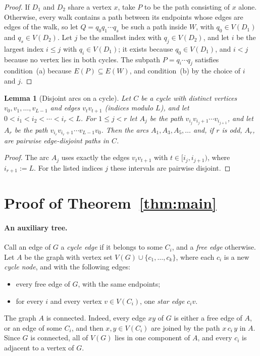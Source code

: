 \documentclass[11pt,a4paper]{article}
\newtheorem{lemma}[theorem]{Lemma}
\theoremstyle{definition}
\theoremstyle{remark}
\begin{document}
\begin{proof}
If \(D_1\) and \(D_2\) share a vertex \(x\), take \(P\) to be the path
consisting of \(x\) alone. Otherwise, every walk contains a path between its
endpoints whose edges are edges of the walk, so let \(Q=q_0q_1\cdots q_s\) be
such a path inside \(W\), with \(q_0\in V(D_1)\) and \(q_s\in V(D_2)\). Let
\(j\) be the smallest index with \(q_j\in V(D_2)\), and let \(i\) be the
largest index \(i\le j\) with \(q_i\in V(D_1)\); it exists because
\(q_0\in V(D_1)\), and \(i<j\) because no vertex lies in both cycles. The
subpath \(P=q_i\cdots q_j\) satisfies condition~(a) because
\(E(P)\subseteq E(W)\), and condition~(b) by the choice of \(i\) and \(j\).
\end{proof}

\begin{lemma}[Disjoint arcs on a cycle]\label{lem:arcs}
Let \(C\) be a cycle with distinct vertices \(v_0,v_1,\dots,v_{L-1}\) and edges
\(v_tv_{t+1}\) (indices modulo \(L\)), and let
\(0<i_1<i_2<\cdots<i_r<L\). For \(1\le j<r\) let \(A_j\) be the path
\(v_{i_j}v_{i_j+1}\cdots v_{i_{j+1}}\), and let \(A_r\) be the path
\(v_{i_r}v_{i_r+1}\cdots v_{L-1}v_0\). Then the arcs \(A_1,A_3,A_5,\dots\) and,
if \(r\) is odd, \(A_r\), are pairwise edge-disjoint paths in \(C\).
\end{lemma}

\begin{proof}
The arc \(A_j\) uses exactly the edges \(v_tv_{t+1}\) with
\(t\in[i_j,i_{j+1})\), where \(i_{r+1}:=L\). For the listed indices \(j\)
these intervals are pairwise disjoint.
\end{proof}

\section{Proof of Theorem~\ref{thm:main}}

\paragraph{An auxiliary tree.}
Call an edge of \(G\) a \emph{cycle edge} if it belongs to some \(C_i\), and a
\emph{free edge} otherwise. Let \(A\) be the graph with vertex set
\(V(G)\cup\{c_1,\dots,c_k\}\), where each \(c_i\) is a new \emph{cycle node},
and with the following edges:
\begin{itemize}
\item every free edge of \(G\), with the same endpoints;
\item for every \(i\) and every vertex \(v\in V(C_i)\), one \emph{star edge}
  \(c_iv\).
\end{itemize}
The graph \(A\) is connected. Indeed, every edge \(xy\) of \(G\) is either a
free edge of \(A\), or an edge of some \(C_i\), and then \(x,y\in V(C_i)\) are
joined by the path \(x\,c_i\,y\) in \(A\). Since \(G\) is connected, all of
\(V(G)\) lies in one component of \(A\), and every \(c_i\) is adjacent to a
vertex of \(G\).
\end{document}
